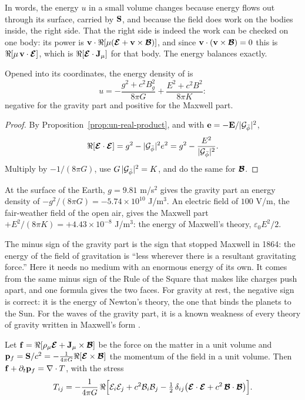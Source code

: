 In words, the energy $u$ in a small volume changes because energy flows out through its surface, carried by $\mathbf{S}$, and because the field does work on the bodies inside, the right side. That the right side is indeed the work can be checked on one body: its power is $\mathbf{v}\cdot\Re[\mu(\boldsymbol{\mathcal{E}} + \mathbf{v}\times\boldsymbol{\mathcal{B}})]$, and since $\mathbf{v}\cdot(\mathbf{v}\times\boldsymbol{\mathcal{B}}) = 0$ this is $\Re[\mu\,\mathbf{v}\cdot\boldsymbol{\mathcal{E}}]$, which is $\Re[\boldsymbol{\mathcal{E}}\cdot\mathbf{J}_\mu]$ for that body. The energy balances exactly.

\begin{proposition}\label{prop:un-two-faces}
Opened into its coordinates, the energy density of  is
\[
u = -\frac{g^2 + c^2 B_g^2}{8\pi G} + \frac{E^2 + c^2 B^2}{8\pi K} :
\]
negative for the gravity part and positive for the Maxwell part.
\end{proposition}

\begin{proof}
By Proposition~\ref{prop:un-real-product}, and with $\mathbf{e} = -\mathbf{E}/|\mathcal{G}_{\bar{\phi}}|^2$,
\[
\Re[\boldsymbol{\mathcal{E}}\cdot\boldsymbol{\mathcal{E}}] = g^2 - |\mathcal{G}_{\bar{\phi}}|^2 e^2 = g^2 - \frac{E^2}{|\mathcal{G}_{\bar{\phi}}|^2} .
\]
Multiply by $-1/(8\pi G)$, use $G\,|\mathcal{G}_{\bar{\phi}}|^2 = K$, and do the same for $\boldsymbol{\mathcal{B}}$.
\end{proof}

\begin{workedexample}
At the surface of the Earth, $g = 9.81$ m/s$^2$ gives the gravity part an energy density of $-g^2/(8\pi G) = -5.74 \times 10^{10}$ J/m$^3$. An electric field of $100$ V/m, the fair-weather field of the open air, gives the Maxwell part $+E^2/(8\pi K) = +4.43 \times 10^{-8}$ J/m$^3$: the energy of Maxwell's theory, $\varepsilon_0 E^2/2$.
\end{workedexample}

The minus sign of the gravity part is the sign that stopped Maxwell in 1864: the energy of the field of gravitation is \enquote{less wherever there is a resultant gravitating force.} Here it needs no medium with an enormous energy of its own. It comes from the same minus sign of the Rule of the Square that makes like charges push apart, and one formula gives the two faces. For gravity at rest, the negative sign is correct: it is the energy of Newton's theory, the one that binds the planets to the Sun. For the waves of the gravity part, it is a known weakness of every theory of gravity written in Maxwell's form \citep[Section 7.2]{MTW1973}.

\begin{theorem}\label{thm:un-momentum}
Let $\mathbf{f} = \Re[\rho_\mu\boldsymbol{\mathcal{E}} + \mathbf{J}_\mu\times\boldsymbol{\mathcal{B}}]$ be the force on the matter in a unit volume and $\mathbf{p}_f = \mathbf{S}/c^2 = -\frac{1}{4\pi G}\Re[\boldsymbol{\mathcal{E}}\times\boldsymbol{\mathcal{B}}]$ the momentum of the field in a unit volume. Then $\mathbf{f} + \partial_t\mathbf{p}_f = \nabla\cdot T$, with the stress
\[
T_{ij} = -\frac{1}{4\pi G}\,\Re\Bigl[\mathcal{E}_i\mathcal{E}_j + c^2\mathcal{B}_i\mathcal{B}_j - \tfrac12\,\delta_{ij}\bigl(\boldsymbol{\mathcal{E}}\cdot\boldsymbol{\mathcal{E}} + c^2\,\boldsymbol{\mathcal{B}}\cdot\boldsymbol{\mathcal{B}}\bigr)\Bigr] .
\]
\end{theorem}

